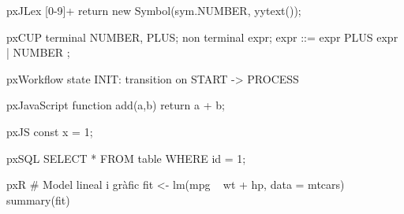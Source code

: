 \documentclass{article}
\begin{document}

\begin{pxCode}{pxJLex}
[0-9]+  { return new Symbol(sym.NUMBER, yytext()); }
\end{pxCode}

\begin{pxCode}{pxCUP}
terminal NUMBER, PLUS;
non terminal expr;
expr ::= expr PLUS expr | NUMBER ;
\end{pxCode}

\begin{pxCode}{pxWorkflow}
state INIT:
    transition on START -> PROCESS
\end{pxCode}

\begin{pxCode}{pxJavaScript}
function add(a,b){ return a + b; }
\end{pxCode}

\begin{pxCode}{pxJS}
const x = 1;
\end{pxCode}

\begin{pxCode}{pxSQL}
SELECT * FROM table WHERE id = 1;
\end{pxCode}

\begin{pxCode}{pxR}
# Model lineal i gràfic
fit <- lm(mpg ~ wt + hp, data = mtcars)
summary(fit)
\end{pxCode}
\end{document}
